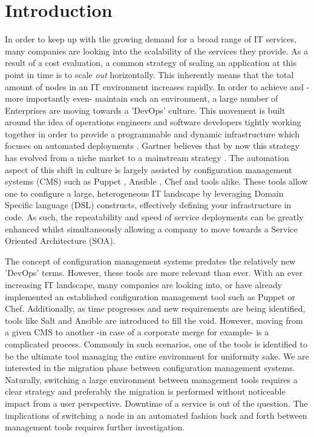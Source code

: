 \section{Introduction}\label{sec:introduction}
In order to keep up with the growing demand for a broad range of IT services, many companies are looking into the scalability of the services they provide. As a result of a cost evaluation, a common strategy of scaling an application at this point in time is to scale \textit{out} horizontally. This inherently means that the total amount of nodes in an IT environment increases rapidly. In order to achieve and -more importantly even- maintain such an environment, a large number of Enterprises are moving towards a 'DevOps' culture. This movement is built around the idea of operations engineers and software developers tightly working together in order to provide a programmable and dynamic infrastructure which focuses on automated deployments \cite{loukides_2012}. Gartner believes that by now this strategy has evolved from a niche market to a mainstream strategy \cite{gartner_2015}. The automation aspect of this shift in culture is largely assisted by configuration management systems (CMS) such as Puppet \cite{whatispuppet}, Ansible \cite{whatisansible}, Chef \cite{whatischef} and tools alike. These tools allow one to configure a large, heterogeneous IT landscape by leveraging Domain Specific language (DSL) constructs, effectively defining your infrastructure in code. As such, the repeatability and speed of service deployments can be greatly enhanced whilst simultaneously allowing a company to move towards a Service Oriented Architecture (SOA).

The concept of configuration management systems predates the relatively new 'DevOps' terms. However, these tools are more relevant than ever. With an ever increasing IT landscape, many companies are looking into, or have already implemented an established configuration management tool such as Puppet or Chef. Additionally, as time progresses and new requirements are being identified, tools like Salt and Ansible are introduced to fill the void. However, moving from a given CMS to another -in case of a corporate merge for example- is a complicated process. Commonly in such scenarios, one of the tools is identified to be the ultimate tool managing the entire environment for uniformity sake. We are interested in the migration phase between configuration management systems. Naturally, switching a large environment between management tools requires a clear strategy and preferably the migration is performed without noticeable impact from a user perspective. Downtime of a service is out of the question. The implications of switching a node in an automated fashion back and forth between management tools requires further investigation. 


